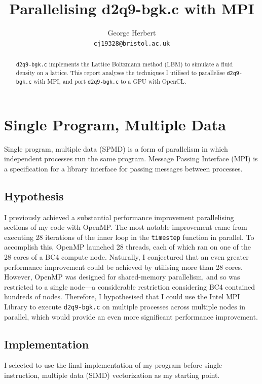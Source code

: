 \documentclass[twocolumn, a4paper]{article}
\author{
  George Herbert\\
  \texttt{cj19328@bristol.ac.uk}
}
\title{\vspace{-2em}Parallelising d2q9-bgk.c with MPI}
\begin{document}
\maketitle

\begin{abstract}
  \texttt{d2q9-bgk.c} implements the Lattice Boltzmann method (LBM) to simulate a fluid density on a lattice.
  This report analyses the techniques I utilised to parallelise \texttt{d2q9-bgk.c} with MPI, and port \texttt{d2q9-bgk.c} to a GPU with OpenCL.
\end{abstract}

\section{Single Program, Multiple Data}

Single program, multiple data (SPMD) is a form of parallelism in which independent processes run the same program.
Message Passing Interface (MPI) is a specification for a library interface for passing messages between processes.

\subsection{Hypothesis}

I previously achieved a substantial performance improvement parallelising sections of my code with OpenMP.
The most notable improvement came from executing 28 iterations of the inner loop in the \texttt{timestep} function in parallel.
To accomplish this, OpenMP launched 28 threads, each of which ran on one of the 28 cores of a BC4 compute node.
Naturally, I conjectured that an even greater performance improvement could be achieved by utilising more than 28 cores.
However, OpenMP was designed for shared-memory parallelism, and so was restricted to a single node---a considerable restriction considering BC4 contained hundreds of nodes.
Therefore, I hypothesised that I could use the Intel MPI Library to execute \texttt{d2q9-bgk.c} on multiple processes across multiple nodes in parallel, which would provide an even more significant performance improvement.

\subsection{Implementation}

I selected to use the final implementation of my program before single instruction, multiple data (SIMD) vectorization as my starting point.
\end{document}
